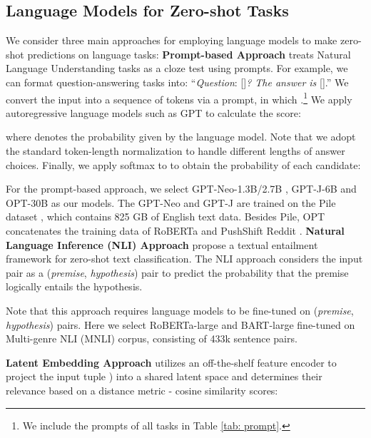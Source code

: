 \documentclass[11pt]{article}
\begin{document}
\subsection{Language Models for Zero-shot Tasks} \label{sec lm}
We consider three main approaches for employing language models to make zero-shot predictions on language tasks:
\medbreak
\noindent \textbf{Prompt-based Approach} \cite{petroni-etal-2019-language, schick-schutze-2021-exploiting} treats Natural Language Understanding tasks as a cloze test using prompts. For example, we can format question-answering tasks into: 
\medbreak
``\textit{Question}: []\textit{? The answer is} [].''
\medbreak
We convert the input  into a sequence of tokens  via a prompt, in which .\footnote{We include the prompts of all tasks in Table \ref{tab: prompt}.} We apply autoregressive language models such as GPT \cite{brown2020language} to calculate the score:

where  denotes the probability given by the language model. Note that we adopt the standard token-length normalization to handle different lengths of answer choices. Finally, we apply softmax to  to obtain the probability of each candidate:


For the prompt-based approach, we select GPT-Neo-1.3B/2.7B \cite{gpt-neo}, GPT-J-6B \cite{gpt-j} and OPT-30B \cite{zhang2022opt} as our models. The GPT-Neo and GPT-J are trained on the Pile dataset \cite{gao2020pile}, which contains 825 GB of English text data. Besides Pile, OPT concatenates the training data of RoBERTa \cite{liu2019roberta} and PushShift Reddit \cite{baumgartner2020pushshift}.
\medbreak
\noindent\textbf{Natural Language Inference (NLI) Approach} 
\cite{yin-etal-2019-benchmarking} propose a textual entailment framework for zero-shot text classification.
The NLI approach considers the input pair  as a (\textit{premise}, \textit{hypothesis}) pair
to predict the probability that the premise logically entails the hypothesis. 

Note that this approach requires language models to be fine-tuned on (\textit{premise}, \textit{hypothesis}) pairs. 
Here we select RoBERTa-large \cite{liu2019roberta} and BART-large \cite{lewis-etal-2020-bart} fine-tuned on Multi-genre NLI (MNLI) corpus, \cite{williams-etal-2018-broad} consisting of 433k sentence pairs.

\label{sec latent}
\medbreak
\noindent\textbf{Latent Embedding Approach} utilizes an off-the-shelf feature encoder  to project the input tuple ) into a shared latent space and determines their relevance based on 
a distance metric - cosine similarity scores:
\end{document}
